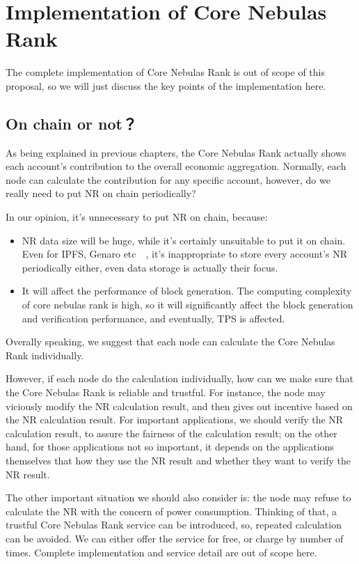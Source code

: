 \section{Implementation of Core Nebulas Rank}
The complete implementation of Core Nebulas Rank is out of scope of this proposal, so we will just discuss the key points of the implementation here.

\subsection{On chain or not？\label{sec:onchain?}}
As being explained in previous chapters, the Core Nebulas Rank actually shows each account’s contribution to the overall economic aggregation. Normally, each node can calculate the contribution for any specific account, however, do we really need to put NR on chain periodically?

In our opinion, it’s unnecessary to put NR on chain, because:
\begin{itemize}
\item NR data size will be huge, while it’s certainly unsuitable to put it on chain. Even for  IPFS, Genaro etc~\cite{IPFS}~\cite{Genaro}, it’s inappropriate to store every account’s NR periodically either, even data storage is actually their focus. 
\item It will affect the performance of block generation. The computing complexity of core nebulas rank is high, so it will significantly affect the block generation and verification performance, and eventually, TPS is affected.
\end{itemize}
\noindent Overally speaking, we suggest that each node can calculate the Core Nebulas Rank individually.

However, if each node do the calculation individually, how can we make sure that the Core Nebulas Rank is reliable and trustful. For instance, the node may viciously modify the NR calculation result, and then gives out incentive based on the NR calculation result. For important applications, we should verify the NR calculation result, to assure the fairness of the calculation result; on the other hand, for those applications not so important, it depends on the applications themselves that how they use the NR result and whether they want to verify the NR result.

The other important situation we should also consider is: the node may refuse to calculate the NR with the concern of power consumption. Thinking of that, a trustful Core Nebulas Rank service can be introduced, so, repeated calculation can be avoided. We can either offer the service for free, or charge by number of times. Complete implementation and service detail are out of scope here.

